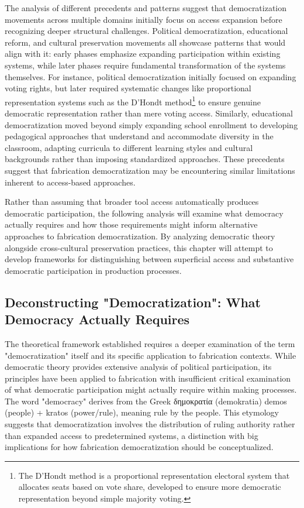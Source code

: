 The analysis of different precedents and patterns suggest that democratization movements across multiple domains initially focus on access expansion before recognizing deeper structural challenges. Political democratization, educational reform, and cultural preservation movements all showcase patterns that would align with it: early phases emphasize expanding participation within existing systems, while later phases require fundamental transformation of the systems themselves. For instance, political democratization initially focused on expanding voting rights, but later required systematic changes like proportional representation systems such as the D'Hondt method\footnote{The D'Hondt method is a proportional representation electoral system that allocates seats based on vote share, developed to ensure more democratic representation beyond simple majority voting.} to ensure genuine democratic representation rather than mere voting access. Similarly, educational democratization moved beyond simply expanding school enrollment to developing pedagogical approaches that understand and accommodate diversity in the classroom, adapting curricula to different learning styles and cultural backgrounds rather than imposing standardized approaches. These precedents suggest that fabrication democratization may be encountering similar limitations inherent to access-based approaches.

\vspace{0.5cm}

Rather than assuming that broader tool access automatically produces democratic participation, the following analysis will examine what democracy actually requires and how those requirements might inform alternative approaches to fabrication democratization. By analyzing democratic theory alongside cross-cultural preservation practices, this chapter will attempt to develop frameworks for distinguishing between superficial access and substantive democratic participation in production processes.

\subsection{Deconstructing "Democratization": What Democracy Actually Requires}

The theoretical framework established requires a deeper examination of the term "democratization" itself and its specific application to fabrication contexts. While democratic theory provides extensive analysis of political participation, its principles have been applied to fabrication with insufficient critical examination of what democratic participation might actually require within making processes. The word "democracy" derives from the Greek {\greekfont δημοκρατία} (demokratia) demos (people) + kratos (power/rule), meaning rule by the people. This etymology suggests that democratization involves the distribution of ruling authority rather than expanded access to predetermined systems, a distinction with big implications for how fabrication democratization should be conceptualized.

